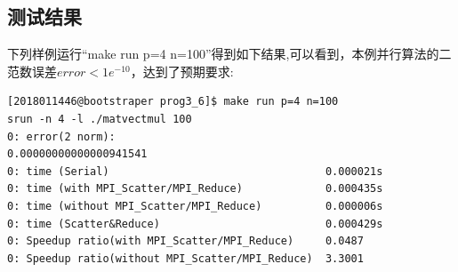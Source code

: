 \documentclass[UTF8, onecolumn, a4paper]{article}
\begin{document}
\subsection{测试结果}
下列样例运行“make run p=4 n=100”得到如下结果,可以看到，本例并行算法的二范数误差$error < 1e^{-10}$，达到了预期要求:
\begin{lstlisting}[language={}, title={$p=4, n=100$}]
[2018011446@bootstraper prog3_6]$ make run p=4 n=100
srun -n 4 -l ./matvectmul 100
0: error(2 norm):                                 0.00000000000000941541
0: time (Serial)                                  0.000021s
0: time (with MPI_Scatter/MPI_Reduce)             0.000435s
0: time (without MPI_Scatter/MPI_Reduce)          0.000006s
0: time (Scatter&Reduce)                          0.000429s
0: Speedup ratio(with MPI_Scatter/MPI_Reduce)     0.0487
0: Speedup ratio(without MPI_Scatter/MPI_Reduce)  3.3001
\end{lstlisting}
\end{document}
